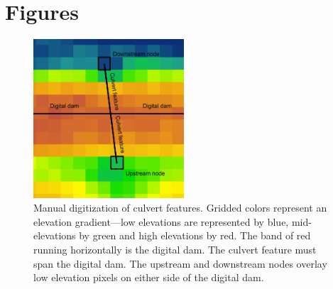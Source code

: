 \documentclass{article}
\begin{document}
\section*{Figures}
	\begin{figure}[h]
		\centering
		\includegraphics[width=0.5\textwidth,natwidth=2188,natheight=2306]{digitizingCulverts.png}
		\caption[Manual digitization of culvert features]{Manual digitization of culvert features. Gridded colors represent an elevation gradient---low elevations are represented by blue, mid-elevations by green and high elevations by red. The band of red running horizontally is the digital dam. The culvert feature must span the digital dam. The upstream and downstream nodes overlay low elevation pixels on either side of the digital dam.}
		\label{fig:digitizingCulverts}
	\end{figure}
\end{document}
